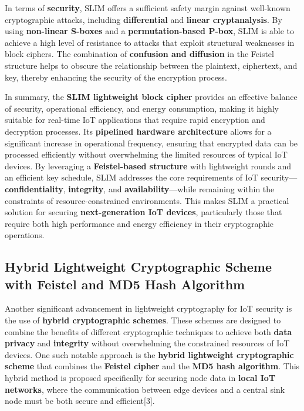 \documentclass{article}
\begin{document}
In terms of \textbf{security}, SLIM offers a sufficient safety margin against well-known cryptographic attacks, including \textbf{differential} and \textbf{linear cryptanalysis}. By using \textbf{non-linear S-boxes} and a \textbf{permutation-based P-box}, SLIM is able to achieve a high level of resistance to attacks that exploit structural weaknesses in block ciphers. The combination of \textbf{confusion and diffusion} in the Feistel structure helps to obscure the relationship between the plaintext, ciphertext, and key, thereby enhancing the security of the encryption process.

In summary, the \textbf{SLIM lightweight block cipher} provides an effective balance of security, operational efficiency, and energy consumption, making it highly suitable for real-time IoT applications that require rapid encryption and decryption processes. Its \textbf{pipelined hardware architecture} allows for a significant increase in operational frequency, ensuring that encrypted data can be processed efficiently without overwhelming the limited resources of typical IoT devices. By leveraging a \textbf{Feistel-based structure} with lightweight rounds and an efficient key schedule, SLIM addresses the core requirements of IoT security—\textbf{confidentiality}, \textbf{integrity}, and \textbf{availability}—while remaining within the constraints of resource-constrained environments. This makes SLIM a practical solution for securing \textbf{next-generation IoT devices}, particularly those that require both high performance and energy efficiency in their cryptographic operations.

\subsection{Hybrid Lightweight Cryptographic Scheme with Feistel and MD5 Hash Algorithm}

Another significant advancement in lightweight cryptography for IoT security is the use of \textbf{hybrid cryptographic schemes}. These schemes are designed to combine the benefits of different cryptographic techniques to achieve both \textbf{data privacy} and \textbf{integrity} without overwhelming the constrained resources of IoT devices. One such notable approach is the \textbf{hybrid lightweight cryptographic scheme} that combines the \textbf{Feistel cipher} and the \textbf{MD5 hash algorithm}. This hybrid method is proposed specifically for securing node data in \textbf{local IoT networks}, where the communication between edge devices and a central sink node must be both secure and efficient[3].
\end{document}
